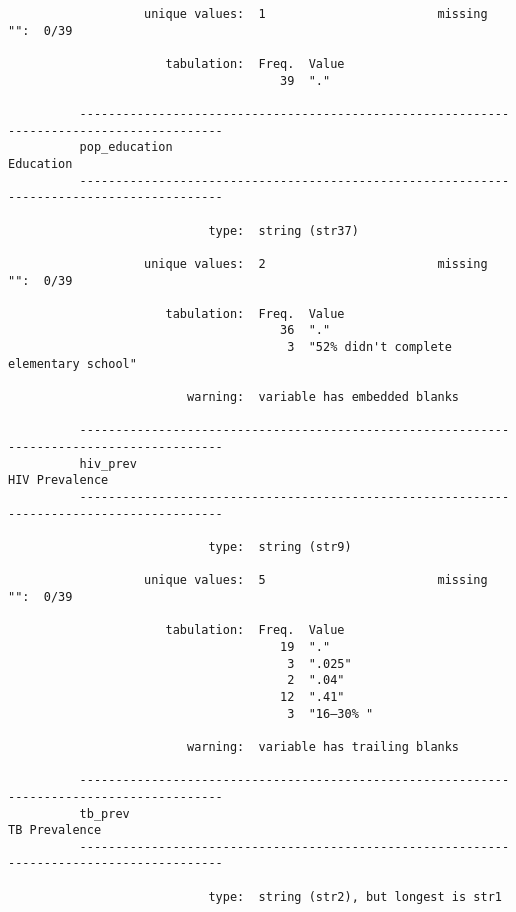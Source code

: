 \documentclass{article}
\begin{document}
\begin{verbatim}
                   unique values:  1                        missing "":  0/39
          
                      tabulation:  Freq.  Value
                                      39  "."
          
          ------------------------------------------------------------------------------------------
          pop_education                                                                    Education
          ------------------------------------------------------------------------------------------
          
                            type:  string (str37)
          
                   unique values:  2                        missing "":  0/39
          
                      tabulation:  Freq.  Value
                                      36  "."
                                       3  "52% didn't complete elementary school"
          
                         warning:  variable has embedded blanks
          
          ------------------------------------------------------------------------------------------
          hiv_prev                                                                    HIV Prevalence
          ------------------------------------------------------------------------------------------
          
                            type:  string (str9)
          
                   unique values:  5                        missing "":  0/39
          
                      tabulation:  Freq.  Value
                                      19  "."
                                       3  ".025"
                                       2  ".04"
                                      12  ".41"
                                       3  "16–30% "
          
                         warning:  variable has trailing blanks
          
          ------------------------------------------------------------------------------------------
          tb_prev                                                                      TB Prevalence
          ------------------------------------------------------------------------------------------
          
                            type:  string (str2), but longest is str1
          

\end{verbatim}
\end{document}
